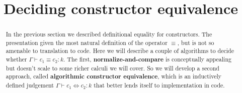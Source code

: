 \documentclass{amsart}
\title{Deciding constructor equivalence}
\begin{document}
\maketitle

\begin{abstract}
    In the previous section we described definitional equality for constructors. The presentation given the most natural definition of the operator $\equiv$, but is not so amenable to translation to code. Here we will describe a couple of algorithms to decide whether $\Gamma \vdash c_1 \equiv c_2 : k$. The first, {\bf normalize-and-compare} is conceptually appealing but doesn't scale to some richer calculi we will cover. So we will develop a second approach, called {\bf algorithmic constructor equivalence}, which is an inductively defined judgement $\Gamma \vdash c_1 \iff c_2 : k$ that better lends itself to implementation in code.
\end{abstract}
\end{document}
